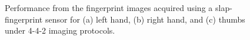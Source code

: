 \begin{figure}[ht]
    \centering

    \caption{Performance from the fingerprint images acquired using a slap-fingerprint sensor for (a) left hand, (b) right hand, and (c) thumbs under 4-4-2 imaging protocols.}
    \label{fingerprint-performance}
\end{figure}